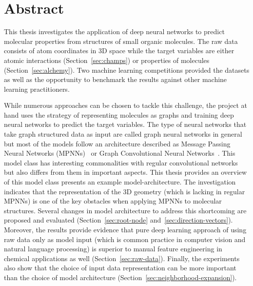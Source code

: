 %


%
%


\section*{\Huge{Abstract}}

\vspace{1cm}
\noindent This thesis investigates the application of deep neural networks to predict molecular properties from structures of small organic molecules. The raw data consists of atom coordinates in 3D space while the target variables are either atomic interactions (Section~\ref{sec:champs}) or properties of molecules (Section~\ref{sec:alchemy}). Two machine learning competitions provided the datasets as well as the opportunity to benchmark the results against other machine learning practitioners.

While numerous approaches can be chosen to tackle this challenge, the project at hand uses the strategy of representing molecules as graphs and training deep neural networks to predict the target variables. The type of neural networks that take graph structured data as input are called graph neural networks in general but most of the models follow an architecture described as Message Passing Neural Networks (MPNNs)~\cite{Gilmer2017} or Graph Convolutional Neural Networks~\cite{Schutt2017}. This model class has interesting commonalities with regular convolutional networks but also differs from them in important aspects. This thesis provides an overview of this model class presents an example model-architecture. The investigation indicates that the representation of the 3D geometry (which is lacking in regular MPNNs) is one of the key obstacles when applying MPNNs to molecular structures. Several changes in model architecture to address this shortcoming are proposed and evaluated (Section~\ref{sec:root-node} and~\ref{sec:direction-vectors}). Moreover, the results provide evidence that pure deep learning approach of using raw data only as model input (which is common practice in computer vision and natural language processing) is superior to manual feature engineering in chemical applications as well (Section~\ref{sec:raw-data}). Finally, the experiments also show that the choice of input data representation can be more important than the choice of model architecture (Section~\ref{sec:neighborhood-expansion}).

